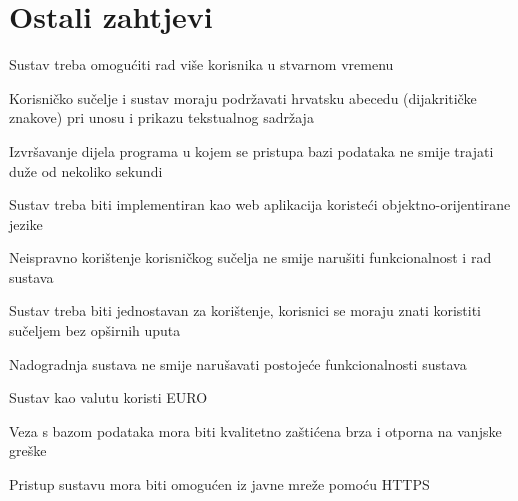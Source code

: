 		\section{Ostali zahtjevi}
		
			\item Sustav treba omogućiti rad više korisnika u stvarnom vremenu
			\item Korisničko sučelje i sustav moraju podržavati hrvatsku abecedu (dijakritičke znakove) pri unosu i prikazu tekstualnog sadržaja
			\item Izvršavanje dijela programa u kojem se pristupa bazi podataka ne smije trajati duže od nekoliko sekundi
			\item Sustav treba biti implementiran kao web aplikacija koristeći objektno-orijentirane jezike
			\item Neispravno korištenje korisničkog sučelja ne smije narušiti funkcionalnost i rad sustava
			\item Sustav treba biti jednostavan za korištenje, korisnici se moraju znati koristiti sučeljem bez opširnih uputa
			\item Nadogradnja sustava ne smije narušavati postojeće funkcionalnosti sustava
			\item Sustav kao valutu koristi EURO
			\item Veza s bazom podataka mora biti kvalitetno zaštićena brza i otporna na vanjske greške
			\item Pristup sustavu mora biti omogućen iz javne mreže pomoću HTTPS